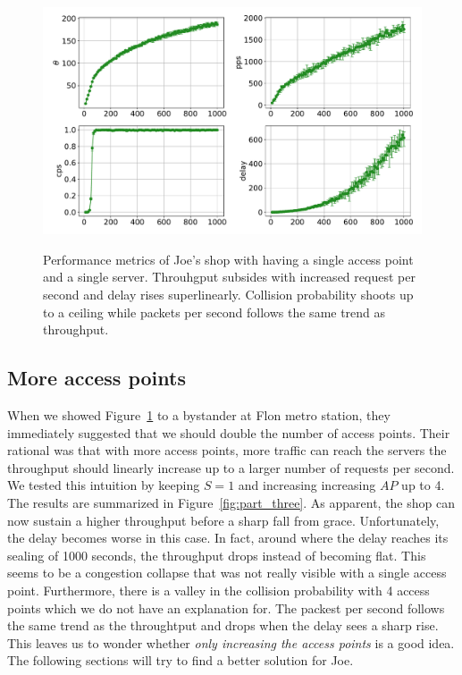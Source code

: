 \documentclass{report}
\begin{document}
\begin{figure}[h]
    \includegraphics[width=\linewidth]{../data/part_two.pdf}
    \label{fig:part_two}
    \caption{Performance metrics of Joe's shop with having a single access
    point and a single server. Throuhgput subsides with increased request per
    second and delay rises superlinearly. Collision probability shoots 
    up to a ceiling while packets per second follows the same trend as 
    throughput.}
\end{figure}

\subsection{More access points}
When we showed Figure~\ref{fig:part_two} to a bystander at Flon metro station, 
they immediately suggested that we should double the number of access points.
Their rational was that with more access points, more traffic can reach the
servers the throughput should linearly increase up to a larger number of 
requests per second. We tested this intuition by keeping $S=1$ and 
increasing increasing $AP$ up to 4. The results are summarized in 
Figure~\ref{fig:part_three}. As apparent, the shop can now sustain a higher
throughput before a sharp fall from grace. Unfortunately, the delay becomes
worse in this case. In fact, around where the delay reaches its sealing of 
1000 seconds, the throughput drops instead of becoming flat. This seems to 
be a congestion collapse that was not really visible with a single access point.
Furthermore, there is a valley in the collision probability with 4 access points
which we do not have an explanation for. The packest per second follows the
same trend as the throughtput and drops when the delay sees a sharp 
rise. This leaves us to wonder whether \emph{only increasing the access points}
is a good idea. The following sections will try to find a better solution for
Joe.
\end{document}
